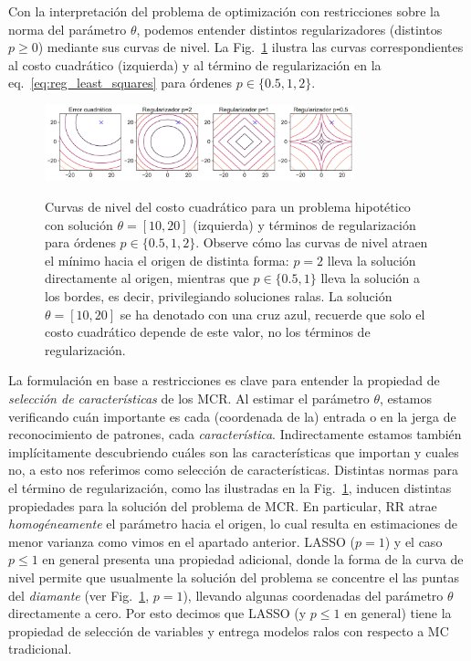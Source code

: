 Con la interpretación del problema de optimización con restricciones sobre la norma del parámetro $\theta$, podemos entender distintos regularizadores (distintos $p\geq0$) mediante sus curvas de nivel. La Fig.~\ref{fig:reg_lin_reg} ilustra las curvas correspondientes al costo cuadrático (izquierda) y al término de regularización en la eq.~\eqref{eq:reg_least_squares} para órdenes $p\in\{0.5,1,2\}$. 

\begin{figure}[H]
	\centering
	\includegraphics[width=0.8\textwidth]{img/cap1_regularizadores.pdf}\\
	\caption{Curvas de nivel del costo cuadrático para un problema hipotético con solución $\theta=[10,20]$ (izquierda) y términos de regularización para órdenes $p\in\{0.5,1,2\}$. Observe cómo las curvas de nivel atraen el mínimo hacia el origen de distinta forma: $p=2$ lleva la solución directamente al origen, mientras que $p\in\{0.5,1\}$ lleva la solución a los bordes, es  decir, privilegiando soluciones ralas. La solución $\theta=[10,20]$ se ha denotado con una cruz azul, recuerde que solo el costo cuadrático depende de este valor, no los términos de regularización. }
	\label{fig:reg_lin_reg}  
\end{figure}

La formulación en base a restricciones es clave para entender la propiedad de \emph{selección de características} de los MCR. Al estimar el parámetro $\theta$, estamos verificando cuán importante es cada (coordenada de la) entrada o en la jerga de reconocimiento de patrones, cada \emph{característica}. Indirectamente estamos también implícitamente descubriendo cuáles son las características que importan y cuales no, a esto nos referimos como selección de características. Distintas normas para el término de regularización, como las ilustradas en la Fig.~\ref{fig:reg_lin_reg}, inducen distintas propiedades para la solución del problema de MCR. En particular, RR atrae \emph{homogéneamente} el parámetro hacia el origen, lo cual resulta  en estimaciones de menor varianza como vimos en el apartado anterior. LASSO ($p=1$) y el caso $p\leq1$ en general presenta una propiedad adicional, donde la forma de la curva de nivel permite que usualmente la solución del problema se concentre el las puntas del \emph{diamante} (ver Fig.~\ref{fig:reg_lin_reg}, $p=1$), llevando algunas coordenadas del parámetro $\theta$ directamente a cero. Por esto decimos que LASSO (y $p\leq1$ en general) tiene la propiedad de selección de variables y entrega modelos ralos con respecto a MC tradicional. 

